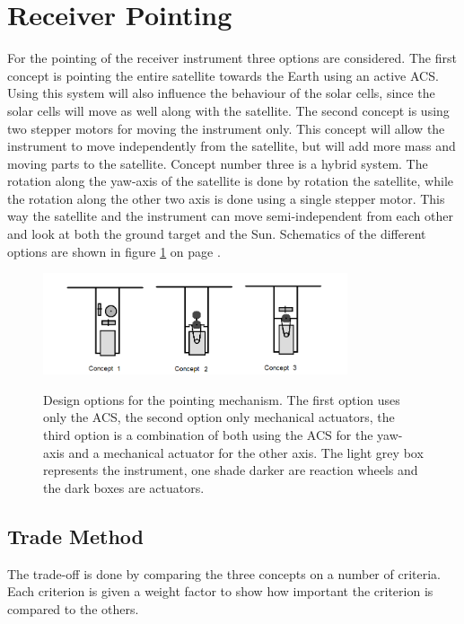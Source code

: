 \section{Receiver Pointing}
\label{RecPoint}
For the pointing of the receiver instrument three options are considered. The first concept is pointing the entire satellite towards the Earth using an active \ac{ACS}. Using this system will also influence the behaviour of the solar cells, since the solar cells will move as well along with the satellite. The second concept is using two stepper motors for moving the instrument only. This concept will allow the instrument to move independently from the satellite, but will add more mass and moving parts to the satellite. Concept number three is a hybrid system. The rotation along the yaw-axis of the satellite is done by rotation the satellite, while the rotation along the other two axis is done using a single stepper motor. This way the satellite and the instrument can move semi-independent from each other and look at both the ground target and the Sun. Schematics of the different options are shown in figure \ref{fig:pointeroptions} on page \pageref{fig:pointeroptions}.

\begin{figure}[h]
\centering
\includegraphics[width=0.8\textwidth]{chapters/img/pointingsystemoptions.png} 
\label{fig:pointeroptions}
\caption[Design options for the pointing mechanism]{Design options for the pointing mechanism. The first option uses only the \ac{ACS}, the second option only mechanical actuators, the third option is a combination of both using the \ac{ACS} for the yaw-axis and a mechanical actuator for the other axis. The light grey box represents the instrument, one shade darker are reaction wheels and the dark boxes are actuators.}
\end{figure}

\subsection{Trade Method}
The trade-off is done by comparing the three concepts on a number of criteria. Each criterion is given a weight factor to show how important the criterion is compared to the others.

